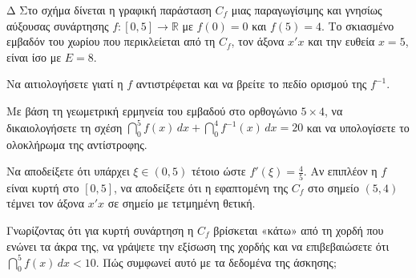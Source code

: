 
\begin{thema}{Δ}
Στο σχήμα δίνεται η γραφική παράσταση $C_f$ μιας παραγωγίσιμης και γνησίως αύξουσας συνάρτησης $f:[0, 5]\to\mathbb{R}$ με $f(0) = 0$ και $f(5) = 4$. Το σκιασμένο εμβαδόν του χωρίου που περικλείεται από τη $C_f$, τον άξονα $x'x$ και την ευθεία $x=5$, είναι ίσο με $E = 8$.

\begin{center}
\end{center}

\begin{erwthma}
  \item Να αιτιολογήσετε γιατί η $f$ αντιστρέφεται και να βρείτε το πεδίο ορισμού της $f^{-1}$.
  \item Με βάση τη γεωμετρική ερμηνεία του εμβαδού στο ορθογώνιο $5 \times 4$, να δικαιολογήσετε τη σχέση $\dint_0^5 f(x)\,dx + \dint_0^4 f^{-1}(x)\,dx = 20$ και να υπολογίσετε το ολοκλήρωμα της αντίστροφης.
  \item Να αποδείξετε ότι υπάρχει $\xi \in (0, 5)$ τέτοιο ώστε $f'(\xi) = \frac{4}{5}$. Αν επιπλέον η $f$ είναι κυρτή στο $[0, 5]$, να αποδείξετε ότι η εφαπτομένη της $C_f$ στο σημείο $(5, 4)$ τέμνει τον άξονα $x'x$ σε σημείο με τετμημένη θετική.
  \item Γνωρίζοντας ότι για κυρτή συνάρτηση η $C_f$ βρίσκεται «κάτω» από τη χορδή που ενώνει τα άκρα της, να γράψετε την εξίσωση της χορδής και να επιβεβαιώσετε ότι $\dint_0^5 f(x)\,dx < 10$. Πώς συμφωνεί αυτό με τα δεδομένα της άσκησης;
\end{erwthma}
\end{thema}

